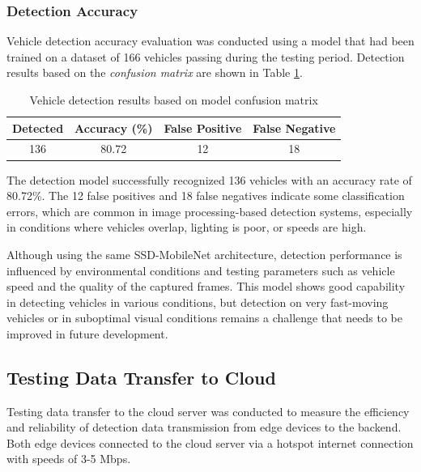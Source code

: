 \subsubsection{Detection Accuracy}

Vehicle detection accuracy evaluation was conducted using a model that had been trained on a dataset of 166 vehicles passing during the testing period. Detection results based on the \emph{confusion matrix} are shown in Table \ref{tab:detection_results_model}.

\begin{table}[htbp]
  \centering
  \begin{tabular}{|c|c|c|c|}
  \hline
  \rowcolor[HTML]{C0C0C0}
  \textbf{Detected} & \textbf{Accuracy (\%)} & \textbf{False Positive} & \textbf{False Negative} \\
  \hline
  136 & 80.72 & 12 & 18 \\
  \hline
  \end{tabular}
  \caption{Vehicle detection results based on model confusion matrix}
  \label{tab:detection_results_model}
\end{table}

The detection model successfully recognized 136 vehicles with an accuracy rate of 80.72\%. The 12 false positives and 18 false negatives indicate some classification errors, which are common in image processing-based detection systems, especially in conditions where vehicles overlap, lighting is poor, or speeds are high.

Although using the same SSD-MobileNet architecture, detection performance is influenced by environmental conditions and testing parameters such as vehicle speed and the quality of the captured frames. This model shows good capability in detecting vehicles in various conditions, but detection on very fast-moving vehicles or in suboptimal visual conditions remains a challenge that needs to be improved in future development.

\subsection{Testing Data Transfer to Cloud}
\label{sec:experiment2}

Testing data transfer to the cloud server was conducted to measure the efficiency and reliability of detection data transmission from edge devices to the backend. Both edge devices connected to the cloud server via a hotspot internet connection with speeds of 3-5 Mbps.

